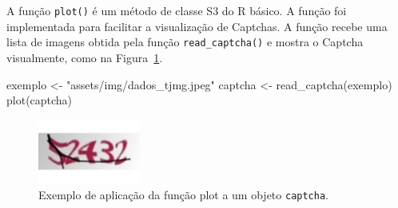 \documentclass[12pt,twoside,brazilian]{book}
\newenvironment{Shaded}{\begin{snugshade}}{\end{snugshade}}
\newcommand{\AttributeTok}[1]{\textcolor[rgb]{0.40,0.45,0.13}{#1}}
\newcommand{\CommentTok}[1]{\textcolor[rgb]{0.37,0.37,0.37}{#1}}
\newcommand{\ConstantTok}[1]{\textcolor[rgb]{0.56,0.35,0.01}{#1}}
\newcommand{\FunctionTok}[1]{\textcolor[rgb]{0.28,0.35,0.67}{#1}}
\newcommand{\NormalTok}[1]{\textcolor[rgb]{0.00,0.23,0.31}{#1}}
\newcommand{\OtherTok}[1]{\textcolor[rgb]{0.00,0.23,0.31}{#1}}
\newcommand{\StringTok}[1]{\textcolor[rgb]{0.13,0.47,0.30}{#1}}
\begin{document}
\begin{Shaded}
\end{Shaded}

A função \texttt{plot()} é um método de classe S3 do R básico. A função
foi implementada para facilitar a visualização de Captchas. A função
recebe uma lista de imagens obtida pela função \texttt{read\_captcha()}
e mostra o Captcha visualmente, como na Figura~\ref{fig-exemplo-plot}.

\begin{Shaded}
\begin{Highlighting}[]
\NormalTok{exemplo }\OtherTok{\textless{}{-}} \StringTok{"assets/img/dados\_tjmg.jpeg"}
\NormalTok{captcha }\OtherTok{\textless{}{-}} \FunctionTok{read\_captcha}\NormalTok{(exemplo)}
\FunctionTok{plot}\NormalTok{(captcha)}
\end{Highlighting}
\end{Shaded}

\begin{figure}[H]

{\centering \includegraphics[width=0.3\textwidth,height=\textheight]{./resultados_files/figure-pdf/fig-exemplo-plot-1.pdf}

}

\caption{\label{fig-exemplo-plot}Exemplo de aplicação da função plot a
um objeto \texttt{captcha}.}

\end{figure}
\end{document}
